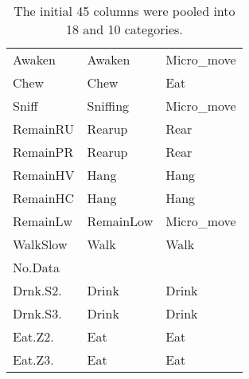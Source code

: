 \begin{table}[!htbp]
\begin{tabular}{|l|l|l|}
  Awaken & Awaken & Micro\_move \\ 
  Chew & Chew & Eat \\ 
  Sniff & Sniffing & Micro\_move \\ 
  RemainRU & Rearup & Rear \\ 
  RemainPR & Rearup & Rear \\ 
  RemainHV & Hang & Hang \\ 
  RemainHC & Hang & Hang \\ 
  RemainLw & RemainLow & Micro\_move \\ 
  WalkSlow & Walk & Walk \\ 
  No.Data &  &  \\ 
  Drnk.S2. & Drink & Drink \\ 
  Drnk.S3. & Drink & Drink \\ 
  Eat.Z2. & Eat & Eat \\ 
  Eat.Z3. & Eat & Eat \\ 
   \hline
\end{tabular}
\caption{The initial 45 columns were pooled into 18 and 10 categories.} 
\label{cat_table}
\end{table}

